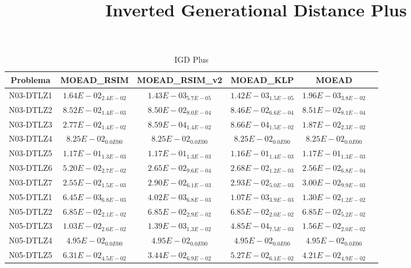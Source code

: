 \documentclass{article}
\title{Inverted Generational Distance Plus}
\author{}
\begin{document}
\maketitle
\begin{table*}[ht!]
\scriptsize
\caption{IGD Plus}
\centering\begin{tabular}{|c||c||c||c||c||c|} \hline
Problema &MOEAD_RSIM &MOEAD_RSIM_v2 &MOEAD_KLP &MOEAD\\\hline
N03-DTLZ1 &$1.64E-02_{2.4E-02}$ &\cellcolor{gray25}$1.43E-03_{5.7E-05}$ &\cellcolor{gray95}$1.42E-03_{1.5E-05}$ &$1.96E-03_{3.8E-02}$\\ 
\hline
N03-DTLZ2 &$8.52E-02_{1.4E-03}$ &\cellcolor{gray25}$8.50E-02_{8.0E-04}$ &\cellcolor{gray95}$8.46E-02_{6.6E-04}$ &$8.51E-02_{8.1E-04}$\\ 
\hline
N03-DTLZ3 &$2.77E-02_{1.4E-02}$ &\cellcolor{gray95}$8.59E-04_{1.4E-02}$ &\cellcolor{gray25}$8.66E-04_{1.5E-02}$ &$1.87E-02_{2.3E-02}$\\ 
\hline
N03-DTLZ4 &\cellcolor{gray95}$8.25E-02_{0.0E00}$ &\cellcolor{gray25}$8.25E-02_{0.0E00}$ &$8.25E-02_{0.0E00}$ &$8.25E-02_{0.0E00}$\\ 
\hline
N03-DTLZ5 &\cellcolor{gray25}$1.17E-01_{1.3E-03}$ &$1.17E-01_{1.3E-03}$ &\cellcolor{gray95}$1.16E-01_{1.4E-03}$ &$1.17E-01_{1.3E-03}$\\ 
\hline
N03-DTLZ6 &$5.20E-02_{2.7E-02}$ &\cellcolor{gray25}$2.65E-02_{9.6E-04}$ &$2.68E-02_{1.2E-03}$ &\cellcolor{gray95}$2.56E-02_{6.8E-04}$\\ 
\hline
N03-DTLZ7 &\cellcolor{gray95}$2.55E-02_{1.5E-03}$ &\cellcolor{gray25}$2.90E-02_{6.1E-03}$ &$2.93E-02_{5.0E-03}$ &$3.00E-02_{9.9E-03}$\\ 
\hline
N05-DTLZ1 &$6.45E-03_{6.8E-03}$ &\cellcolor{gray25}$4.02E-03_{6.8E-03}$ &\cellcolor{gray95}$1.07E-03_{3.9E-03}$ &$1.30E-02_{1.2E-02}$\\ 
\hline
N05-DTLZ2 &\cellcolor{gray25}$6.85E-02_{2.1E-02}$ &$6.85E-02_{2.9E-02}$ &\cellcolor{gray95}$6.85E-02_{2.0E-02}$ &$6.85E-02_{5.2E-02}$\\ 
\hline
N05-DTLZ3 &$1.03E-02_{2.6E-02}$ &\cellcolor{gray25}$1.39E-03_{1.3E-02}$ &\cellcolor{gray95}$4.85E-04_{7.5E-03}$ &$1.56E-02_{2.0E-02}$\\ 
\hline
N05-DTLZ4 &\cellcolor{gray95}$4.95E-02_{0.0E00}$ &\cellcolor{gray25}$4.95E-02_{0.0E00}$ &$4.95E-02_{0.0E00}$ &$4.95E-02_{0.0E00}$\\ 
\hline
N05-DTLZ5 &$6.31E-02_{4.5E-02}$ &\cellcolor{gray95}$3.44E-02_{6.9E-02}$ &$5.27E-02_{6.1E-02}$ &\cellcolor{gray25}$4.21E-02_{4.9E-02}$\\ 

\end{tabular}
\end{table*}
\end{document}
